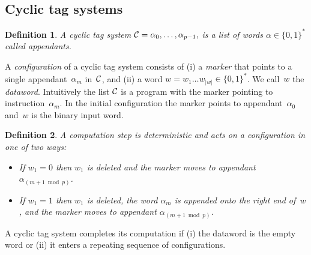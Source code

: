 \documentclass[11pt]{article} \usepackage{amsfonts,amsmath,amssymb,amsthm}
\newtheorem{definition}{Definition}
\begin{document}
\subsection{Cyclic tag systems}\label{sec:Cyclic tag systems}
\begin{definition}\label{def:Cyclic tag system}
A cyclic tag system $\mathcal{C}=\alpha_0,\ldots,\alpha_{p-1},$ is a list 
of words $\alpha\in\{0,1\}^{\ast}$ called appendants.
\end{definition}
A {\em configuration} of a cyclic tag system consists of (i) a {\em marker} that points to a single appendant~$\alpha_{m}$ in~$\mathcal{C}$, and (ii) a word $w=w_1\ldots w_{|w|}\in\{0,1\}^*$. We call~$w$ the {\em dataword}. Intuitively the list $\mathcal{C}$ is a program with the marker pointing to instruction~$\alpha_{m}$. In the initial configuration the marker points to appendant~$\alpha_0$ and~$w$ is the binary input word.
\begin{definition}\label{def:Computation CTS}
A computation step is deterministic and acts on a configuration in one of 
two ways:
\begin{itemize}
\item If $w_1 = 0$ then $w_1$ is deleted and the marker moves to appendant 
$\alpha_{(m+1\bmod p)}$.
\item If $w_1 = 1$ then $w_1$ is deleted, the word $\alpha_{m}$ is 
appended onto the right end of~$w$,  and the marker moves to appendant 
$\alpha_{(m+1\bmod p)}$.
\end{itemize}
\end{definition}
A cyclic tag system completes its computation if (i) the dataword is the empty word or (ii) it enters a repeating sequence of configurations.
\end{document}
